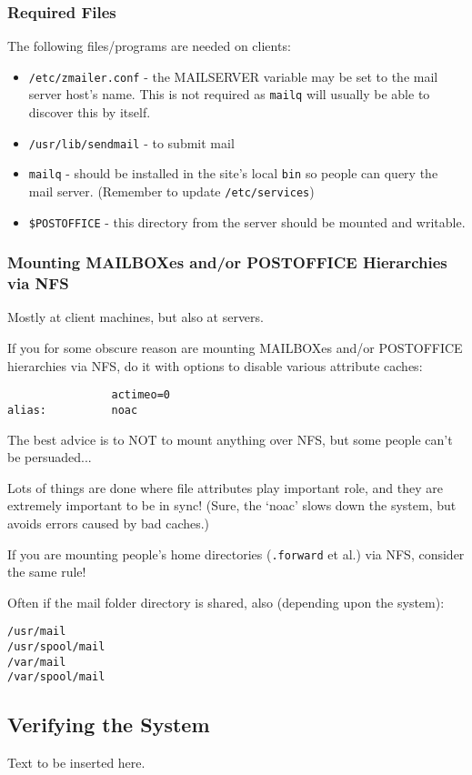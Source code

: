 \subsubsection{Required Files}

The following files/programs are needed on clients:
\begin{itemize}
\item {\tt /etc/zmailer.conf} - the MAILSERVER variable may be set to the
mail server host's name.  This is not required as {\tt mailq} will usually be able
to discover this by itself.
\item {\tt /usr/lib/sendmail} - to submit mail
\item {\tt mailq} - should be installed in the site's local
{\tt bin} so people can query the mail server. (Remember to update {\tt /etc/services})
\item {\tt \$POSTOFFICE} - this directory from the server should be mounted and writable.
\end{itemize}





\subsubsection{Mounting MAILBOXes and/or POSTOFFICE Hierarchies via NFS}

Mostly at client machines, but also at servers.

If you for some obscure reason are mounting MAILBOXes
and/or POSTOFFICE hierarchies via NFS, do it with
options to disable various attribute caches:
\begin{verbatim}
                actimeo=0
alias:          noac
\end{verbatim}

The best advice is to NOT to mount anything over NFS,
but some people can't be persuaded...

Lots of things are done where file attributes play important
role, and they are extremely important to be in sync!
(Sure, the `noac' slows down the system, but avoids errors
caused by bad caches.)

If you are mounting people's home directories ({\tt .forward} et al.)
via NFS, consider the same rule!

Often if the mail folder directory is shared, also (depending upon the system):
\begin{verbatim}
/usr/mail
/usr/spool/mail
/var/mail
/var/spool/mail
\end{verbatim}





\subsection{Verifying the System}

Text to be inserted here.
